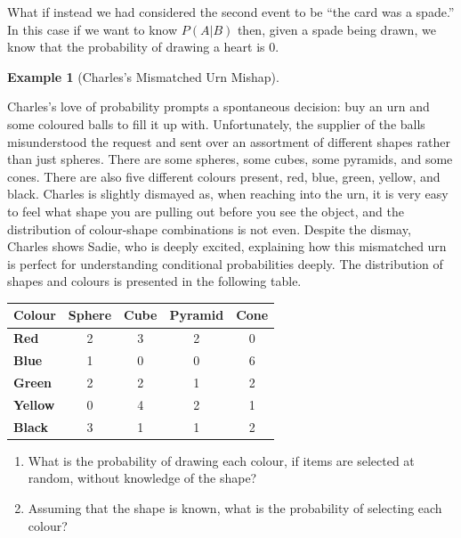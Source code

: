 \documentclass[
  letterpaper,
  DIV=11,
  numbers=noendperiod]{scrreprt}
\providecommand{\tightlist}{%
  \setlength{\itemsep}{0pt}\setlength{\parskip}{0pt}}\usepackage{longtable,booktabs,array}
\theoremstyle{definition}
\theoremstyle{definition}
\newtheorem{example}{Example}[chapter]
\theoremstyle{definition}
\theoremstyle{remark}
\begin{document}
What if instead we had considered the second event to be ``the card was
a spade.'' In this case if we want to know \(P(A|B)\) then, given a
spade being drawn, we know that the probability of drawing a heart is
\(0\).

\begin{example}[Charles's Mismatched Urn
Mishap]\protect\hypertarget{exm-conditional-probability-urn}{}\label{exm-conditional-probability-urn}

Charles's love of probability prompts a spontaneous decision: buy an urn
and some coloured balls to fill it up with. Unfortunately, the supplier
of the balls misunderstood the request and sent over an assortment of
different shapes rather than just spheres. There are some spheres, some
cubes, some pyramids, and some cones. There are also five different
colours present, red, blue, green, yellow, and black. Charles is
slightly dismayed as, when reaching into the urn, it is very easy to
feel what shape you are pulling out before you see the object, and the
distribution of colour-shape combinations is not even. Despite the
dismay, Charles shows Sadie, who is deeply excited, explaining how this
mismatched urn is perfect for understanding conditional probabilities
deeply. The distribution of shapes and colours is presented in the
following table.

\begin{longtable}[]{@{}lcccc@{}}
\toprule\noalign{}
\textbf{Colour} & \textbf{Sphere} & \textbf{Cube} & \textbf{Pyramid} &
\textbf{Cone} \\
\midrule\noalign{}
\endhead
\bottomrule\noalign{}
\endlastfoot
\textbf{Red} & 2 & 3 & 2 & 0 \\
\textbf{Blue} & 1 & 0 & 0 & 6 \\
\textbf{Green} & 2 & 2 & 1 & 2 \\
\textbf{Yellow} & 0 & 4 & 2 & 1 \\
\textbf{Black} & 3 & 1 & 1 & 2 \\
\end{longtable}

\begin{enumerate}
\def\labelenumi{\alph{enumi}.}
\tightlist
\item
  What is the probability of drawing each colour, if items are selected
  at random, without knowledge of the shape?
\item
  Assuming that the shape is known, what is the probability of selecting
  each colour?
\end{enumerate}


\end{example}
\end{document}
